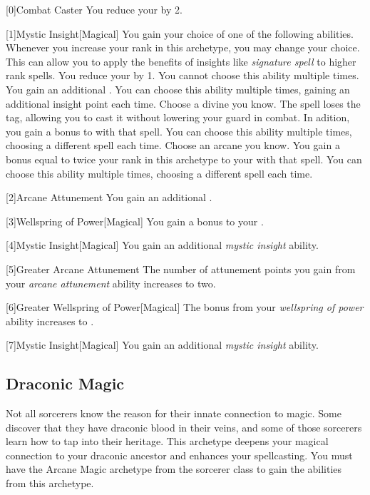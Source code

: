         [0]{Combat Caster} You reduce your  by 2.

        [1]{Mystic Insight}[Magical]
        You gain your choice of one of the following abilities.
        Whenever you increase your rank in this archetype, you may change your choice.
        This can allow you to apply the benefits of insights like \textit{signature spell} to higher rank spells.
        {
             You reduce your  by 1.
                You cannot choose this ability multiple times.
             You gain an additional .
                You can choose this ability multiple times, gaining an additional insight point each time.
             Choose a divine  you know.
                The spell loses the  tag, allowing you to cast it without lowering your guard in combat.
                In adition, you gain a  bonus to  with that spell.
                You can choose this ability multiple times, choosing a different spell each time.
             Choose an arcane  you know.
                You gain a bonus equal to twice your rank in this archetype to your  with that spell.
                You can choose this ability multiple times, choosing a different spell each time.
        }

        [2]{Arcane Attunement} You gain an additional .

        [3]{Wellspring of Power}[Magical]
        You gain a  bonus to your  .

        [4]{Mystic Insight}[Magical]
        You gain an additional \textit{mystic insight} ability.

        [5]{Greater Arcane Attunement} The number of attunement points you gain from your \textit{arcane attunement} ability increases to two.

        [6]{Greater Wellspring of Power}[Magical]
        The bonus from your \textit{wellspring of power} ability increases to .

        [7]{Mystic Insight}[Magical]
        You gain an additional \textit{mystic insight} ability.

    \newpage
    \subsection{Draconic Magic}
        Not all sorcerers know the reason for their innate connection to magic.
        Some discover that they have draconic blood in their veins, and some of those sorcerers learn how to tap into their heritage.
        This archetype deepens your magical connection to your draconic ancestor and enhances your spellcasting.
        You must have the Arcane Magic archetype from the sorcerer class to gain the abilities from this archetype.

